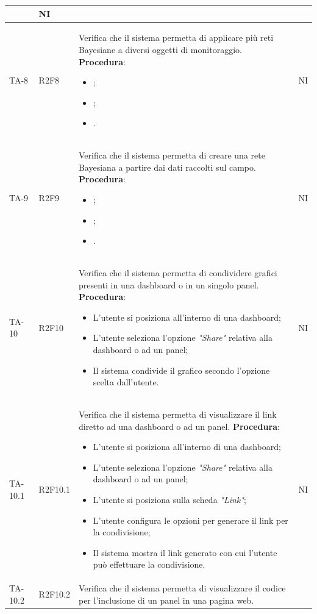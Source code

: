 \begin{longtable}{|C{2.5cm}|C{2.5cm}|L{6.5cm}|C{1.5cm}|}
	 & {NI}\\
	\hline
	{TA-8} & {R2F8} & 
	Verifica che il sistema permetta di applicare più reti Bayesiane a diversi oggetti di monitoraggio.
	\textbf{Procedura}:
	\begin{itemize}		
		\item ;
		\item ;
		\item .
	\end{itemize}
	 & {NI}\\
	\hline
	{TA-9} & {R2F9} & 
	Verifica che il sistema permetta di creare una rete Bayesiana a partire dai dati raccolti
	sul campo.
	\textbf{Procedura}:
	\begin{itemize}		
		\item ;
		\item ;
		\item .
	\end{itemize}
	 & {NI}\\
	\hline
	{TA-10} & {R2F10} & 
	Verifica che il sistema permetta di condividere grafici presenti in una dashboard o in un singolo panel.
	\textbf{Procedura}:
	\begin{itemize}		
		\item L'utente si posiziona all'interno di una dashboard;
		\item L'utente seleziona l'opzione \emph{"Share"} relativa alla dashboard o ad un panel;
		\item Il sistema condivide il grafico secondo l'opzione scelta dall'utente.
	\end{itemize}
	 & {NI}\\
	\hline
	{TA-10.1} & {R2F10.1} & 
	Verifica che il sistema permetta di visualizzare il link diretto ad una dashboard o ad un
	panel.
	\textbf{Procedura}:
	\begin{itemize}		
		\item L'utente si posiziona all'interno di una dashboard;
		\item L'utente seleziona l'opzione \emph{"Share"} relativa alla dashboard o ad un panel;
		\item L'utente si posiziona sulla scheda \emph{"Link"};
		\item L'utente configura le opzioni per generare il link per la condivisione;
		\item Il sistema mostra il link generato con cui l'utente può effettuare la condivisione.
	\end{itemize}
	 & {NI}\\
	\hline
	{TA-10.2} & {R2F10.2} & 
	Verifica che il sistema permetta di visualizzare il codice per l'inclusione di un panel in una pagina web.

\end{longtable}
